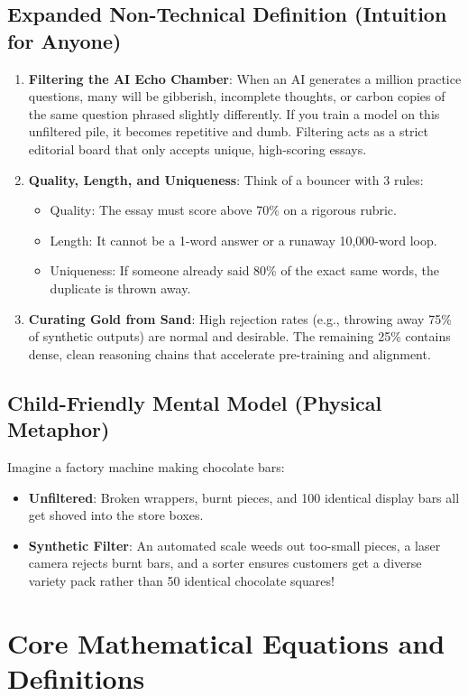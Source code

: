 \documentclass[11pt,a4paper]{article}
\theoremstyle{definition}
\begin{document}
\subsection{Expanded Non-Technical Definition (Intuition for Anyone)}
\begin{enumerate}
    \item \textbf{Filtering the AI Echo Chamber}: When an AI generates a million practice questions, many will be gibberish, incomplete thoughts, or carbon copies of the same question phrased slightly differently. If you train a model on this unfiltered pile, it becomes repetitive and dumb. Filtering acts as a strict editorial board that only accepts unique, high-scoring essays.
    \item \textbf{Quality, Length, and Uniqueness}: Think of a bouncer with 3 rules:
    \begin{itemize}
        \item Quality: The essay must score above 70\% on a rigorous rubric.
        \item Length: It cannot be a 1-word answer or a runaway 10,000-word loop.
        \item Uniqueness: If someone already said 80\% of the exact same words, the duplicate is thrown away.
    \end{itemize}
    \item \textbf{Curating Gold from Sand}: High rejection rates (e.g., throwing away 75\% of synthetic outputs) are normal and desirable. The remaining 25\% contains dense, clean reasoning chains that accelerate pre-training and alignment.
\end{enumerate}

\subsection{Child-Friendly Mental Model (Physical Metaphor)}
Imagine a factory machine making chocolate bars:
\begin{itemize}
    \item \textbf{Unfiltered}: Broken wrappers, burnt pieces, and 100 identical display bars all get shoved into the store boxes.
    \item \textbf{Synthetic Filter}: An automated scale weeds out too-small pieces, a laser camera rejects burnt bars, and a sorter ensures customers get a diverse variety pack rather than 50 identical chocolate squares!
\end{itemize}

\section{Core Mathematical Equations and Definitions}
\end{document}
